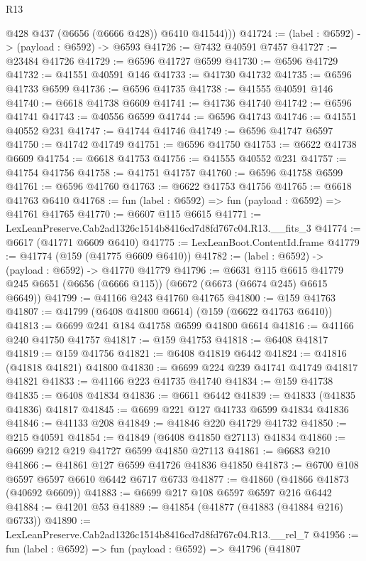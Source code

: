 \begin{lexlean}{R13}
\begin{coremodule}
          @428
          @437
          (@6656 (@6666 @428))
          @6410
          @41544)))
@41724 := (label : @6592) -> (payload : @6592) -> @6593
@41726 := @7432 @40591 @7457
@41727 := @23484 @41726
@41729 := @6596 @41727 @6599
@41730 := @6596 @41729
@41732 := @41551 @40591 @146
@41733 := @41730 @41732
@41735 := @6596 @41733 @6599
@41736 := @6596 @41735
@41738 := @41555 @40591 @146
@41740 := @6618 @41738 @6609
@41741 := @41736 @41740
@41742 := @6596 @41741
@41743 := @40556 @6599
@41744 := @6596 @41743
@41746 := @41551 @40552 @231
@41747 := @41744 @41746
@41749 := @6596 @41747 @6597
@41750 := @41742 @41749
@41751 := @6596 @41750
@41753 := @6622 @41738 @6609
@41754 := @6618 @41753
@41756 := @41555 @40552 @231
@41757 := @41754 @41756
@41758 := @41751 @41757
@41760 := @6596 @41758 @6599
@41761 := @6596 @41760
@41763 := @6622 @41753 @41756
@41765 := @6618 @41763 @6410
@41768 := fun (label : @6592) => fun (payload : @6592) => @41761 @41765
@41770 := @6607 @115 @6615
@41771 := LexLeanPreserve.Cab2ad1326c1514b8416cd7d8fd767c04.R13.__fits_3
@41774 := @6617 (@41771 @6609 @6410)
@41775 := LexLeanBoot.ContentId.frame
@41779 := @41774 (@159 (@41775 @6609 @6410))
@41782 := (label : @6592) -> (payload : @6592) -> @41770 @41779
@41796 := @6631
    @115
    @6615
    @41779
    @245
    @6651
    (@6656 (@6666 @115))
    (@6672 (@6673 (@6674 @245) @6615 @6649))
@41799 := @41166 @243 @41760 @41765
@41800 := @159 @41763
@41807 := @41799 (@6408 @41800 @6614) (@159 (@6622 @41763 @6410))
@41813 := @6699 @241 @184 @41758 @6599 @41800 @6614
@41816 := @41166 @240 @41750 @41757
@41817 := @159 @41753
@41818 := @6408 @41817
@41819 := @159 @41756
@41821 := @6408 @41819 @6442
@41824 := @41816 (@41818 @41821) @41800
@41830 := @6699 @224 @239 @41741 @41749 @41817 @41821
@41833 := @41166 @223 @41735 @41740
@41834 := @159 @41738
@41835 := @6408 @41834
@41836 := @6611 @6442
@41839 := @41833 (@41835 @41836) @41817
@41845 := @6699 @221 @127 @41733 @6599 @41834 @41836
@41846 := @41133 @208
@41849 := @41846 @220 @41729 @41732
@41850 := @215 @40591
@41854 := @41849 (@6408 @41850 @27113) @41834
@41860 := @6699 @212 @219 @41727 @6599 @41850 @27113
@41861 := @6683 @210
@41866 := @41861 @127 @6599 @41726 @41836 @41850
@41873 := @6700 @108 @6597 @6597 @6610 @6442 @6717 @6733
@41877 := @41860 (@41866 @41873 (@40692 @6609))
@41883 := @6699 @217 @108 @6597 @6597 @216 @6442
@41884 := @41201 @53
@41889 := @41854 (@41877 (@41883 (@41884 @216) @6733))
@41890 := LexLeanPreserve.Cab2ad1326c1514b8416cd7d8fd767c04.R13.__rel_7
@41956 := fun (label : @6592) =>
  fun (payload : @6592) =>
  @41796
    (@41807

\end{coremodule}
\end{lexlean}
